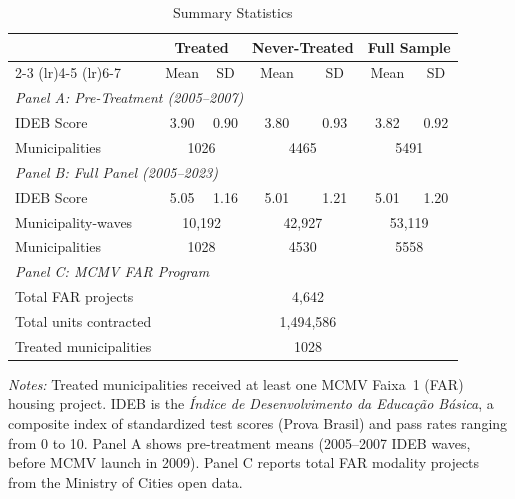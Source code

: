 \begin{table}[t]
\centering
\caption{Summary Statistics}
\label{tab:summary}
\begin{threeparttable}
\begin{tabular}{lcccccc}
\toprule
 & \multicolumn{2}{c}{Treated} & \multicolumn{2}{c}{Never-Treated} & \multicolumn{2}{c}{Full Sample} \\
\cmidrule(lr){2-3} \cmidrule(lr){4-5} \cmidrule(lr){6-7}
 & Mean & SD & Mean & SD & Mean & SD \\
\midrule
\multicolumn{7}{l}{\textit{Panel A: Pre-Treatment (2005--2007)}} \\[3pt]
IDEB Score & 3.90 & 0.90 & 3.80 & 0.93 & 3.82 & 0.92 \\
Municipalities & \multicolumn{2}{c}{1026} & \multicolumn{2}{c}{4465} & \multicolumn{2}{c}{5491} \\
\midrule
\multicolumn{7}{l}{\textit{Panel B: Full Panel (2005--2023)}} \\[3pt]
IDEB Score & 5.05 & 1.16 & 5.01 & 1.21 & 5.01 & 1.20 \\
Municipality-waves & \multicolumn{2}{c}{10,192} & \multicolumn{2}{c}{42,927} & \multicolumn{2}{c}{53,119} \\
Municipalities & \multicolumn{2}{c}{1028} & \multicolumn{2}{c}{4530} & \multicolumn{2}{c}{5558} \\
\midrule
\multicolumn{7}{l}{\textit{Panel C: MCMV FAR Program}} \\[3pt]
Total FAR projects & \multicolumn{6}{c}{4,642} \\
Total units contracted & \multicolumn{6}{c}{1,494,586} \\
Treated municipalities & \multicolumn{6}{c}{1028} \\
\bottomrule
\end{tabular}
\begin{tablenotes}
\item \textit{Notes:} Treated municipalities received at least one MCMV Faixa~1 (FAR) housing project. IDEB is the \textit{\'{I}ndice de Desenvolvimento da Educa\c{c}\~{a}o B\'{a}sica}, a composite index of standardized test scores (Prova Brasil) and pass rates ranging from 0 to 10. Panel A shows pre-treatment means (2005--2007 IDEB waves, before MCMV launch in 2009). Panel C reports total FAR modality projects from the Ministry of Cities open data.
\end{tablenotes}
\end{threeparttable}
\end{table}
